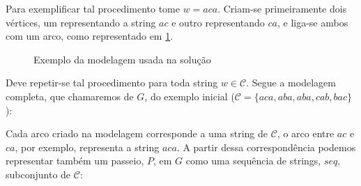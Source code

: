         Para exemplificar tal procedimento tome $w = aca$. Criam-se primeiramente dois vértices, um representando a string $ac$ e outro representando $ca$, e liga-se ambos com um arco, como representado em \ref{fig:tanya}.

        \begin{figure}[H]
            \centering

            \caption{Exemplo da modelagem usada na solução}
            \label{fig:tanya}
        \end{figure}

        \sloppy Deve repetir-se tal procedimento para toda string $w \in \mathcal{C}$. Segue a modelagem completa, que chamaremos de $G$, do exemplo inicial ($\mathcal{C} = \{aca, aba, aba, cab, bac\}$):
       

        \begin{figure}[H]
            \centering
        \end{figure}


        Cada arco criado na modelagem corresponde a uma string de $\mathcal{C}$, o arco entre $ac$ e $ca$, por exemplo, representa a string $aca$.
        A partir dessa correspondência podemos representar também um passeio, $P$, em $G$ como uma sequência de strings, $seq$, subconjunto de $\mathcal{C}$:

